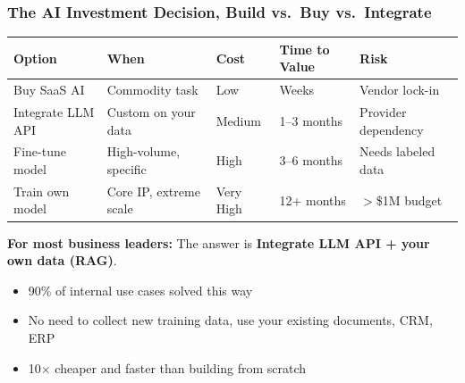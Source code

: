 \begin{frame}[fragile]\frametitle{The AI Investment Decision, Build vs.\ Buy vs.\ Integrate}

\begin{center}
\begin{tabular}{|p{1.2cm}|p{1.2cm}|p{1.2cm}|p{1.2cm}|p{1.2cm}|}

\hline
\textbf{Option} & \textbf{When} & \textbf{Cost} & \textbf{Time to Value} & \textbf{Risk} \\
\hline
Buy SaaS AI & Commodity task & Low & Weeks & Vendor lock-in \\
Integrate LLM API & Custom on your data & Medium & 1--3 months & Provider dependency \\
Fine-tune model & High-volume, specific & High & 3--6 months & Needs labeled data \\
Train own model & Core IP, extreme scale & Very High & 12+ months & $>$\$1M budget \\
\hline
\end{tabular}
\end{center}

\vspace{0.3em}
\textbf{For most business leaders:} The answer is \textbf{Integrate LLM API + your own data (RAG)}.
\begin{itemize}
  \item 90\% of internal use cases solved this way
  \item No need to collect new training data, use your existing documents, CRM, ERP
  \item 10$\times$ cheaper and faster than building from scratch
\end{itemize}

\end{frame}

